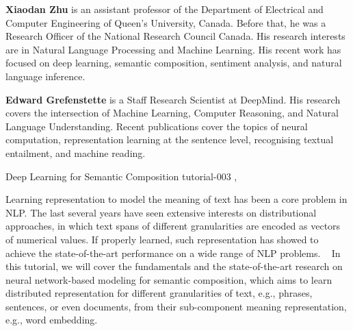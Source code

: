 \begin{bio}
  {\bfseries Xiaodan Zhu} is an assistant professor of the Department of Electrical and Computer Engineering of Queen’s University, Canada. Before that, he was a Research Officer of the National Research Council Canada. His research interests are in Natural Language Processing and Machine Learning. His recent work has focused on deep learning, semantic composition, sentiment analysis, and natural language inference.

  {\bfseries Edward Grefenstette} is a Staff Research Scientist at DeepMind. His research covers the intersection of Machine Learning, Computer Reasoning, and Natural Language Understanding. Recent publications cover the topics of neural computation, representation learning at the sentence level, recognising textual entailment, and machine reading. 
\end{bio}

\begin{tutorial}
  {Deep Learning for Semantic Composition}
  {tutorial-003}
  {\daydateyear, \tutorialmorningtime}
  {\TutLocC}

Learning representation to model the meaning of text has been a core problem in NLP. The last several years have seen extensive interests on distributional approaches, in which text spans of different granularities are encoded as vectors of numerical values. If properly learned, such representation has showed to achieve the state-of-the-art performance on a wide range of NLP problems.
 
In this tutorial, we will cover the fundamentals and the state-of-the-art research on neural network-based modeling for semantic composition, which aims to learn distributed representation for different granularities of text, e.g., phrases, sentences, or even documents, from their sub-component meaning representation, e.g., word embedding.
\end{tutorial}
